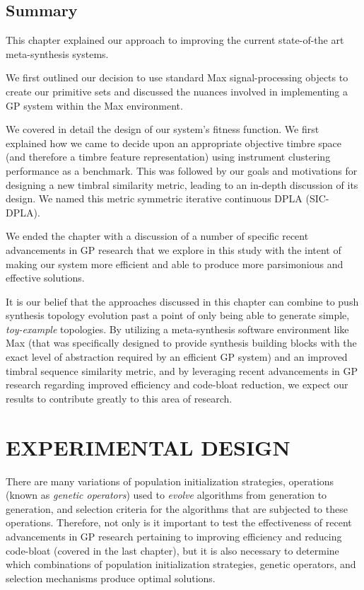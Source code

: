 \documentclass[12pt]{report} 	%
\numberwithin{figure}{chapter}
\numberwithin{table}{chapter}
\numberwithin{equation}{chapter}
\begin{document}
\begin{flushleft}
\section{Summary}
This chapter explained our approach to improving the current state-of-the art meta-synthesis systems. 

We first outlined our decision to use standard Max signal-processing objects to create our primitive sets and discussed the nuances involved in implementing a GP system within the Max environment.

We covered in detail the design of our system's fitness function. We first explained how we came to decide upon an appropriate objective timbre space (and therefore a timbre feature representation) using instrument clustering performance as a benchmark. This was followed by our goals and motivations for designing a new timbral similarity metric, leading to an in-depth discussion of its design. We named this metric symmetric iterative continuous DPLA (SIC-DPLA).

We ended the chapter with a discussion of a number of specific recent advancements in GP research that we explore in this study with the intent of making our system more efficient and able to produce more parsimonious and effective solutions.

It is our belief that the approaches discussed in this chapter can combine to push synthesis topology evolution past a point of only being able to generate simple, \textit{toy-example} topologies. By utilizing a meta-synthesis software environment like Max (that was specifically designed to provide synthesis building blocks with the exact level of abstraction required by an efficient GP system) and an improved timbral sequence similarity metric, and by leveraging recent advancements in GP research regarding improved efficiency and code-bloat reduction, we expect our results to contribute greatly to this area of research.
\vspace*{\QuarterPage}
\chapter{EXPERIMENTAL DESIGN} %
There are many variations of population initialization strategies, operations (known as \textit{genetic operators}) used to \textit{evolve} algorithms from generation to generation, and  selection criteria for the algorithms that are subjected to these operations. Therefore, not only is it important to test the effectiveness of recent advancements in GP research pertaining to improving efficiency and reducing code-bloat (covered in the last chapter), but it is also necessary to determine which combinations of population initialization strategies, genetic operators, and selection mechanisms produce optimal solutions.


\end{flushleft}
\end{document}

